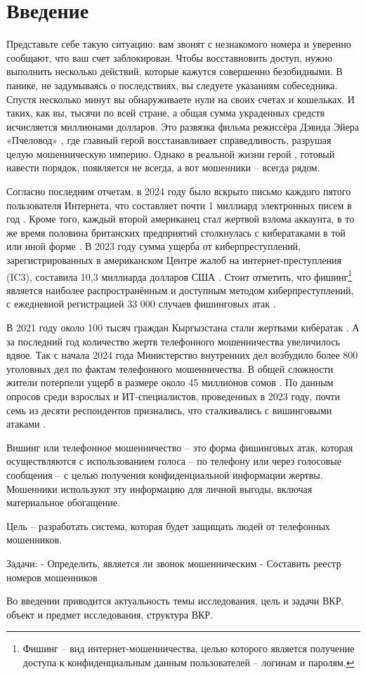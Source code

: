 \section*{\centering Введение}

Представьте себе такую ситуацию: вам звонят с незнакомого номера и уверенно сообщают, что ваш счет заблокирован. Чтобы восставновить доступ, нужно выполнить несколько действий, которые кажутся совершенно безобидными. В панике, не задумываясь о последствиях, вы следуете указаниям собеседника. Спустя несколько минут вы обнаруживаете нули на своих счетах и кошельках. И таких, как вы, тысячи по всей стране, а общая сумма украденных средств исчисляется миллионами долларов. Это развязка фильма режиссёра Дэвида Эйера «Пчеловод» \cite{beekeeper2024}, где главный герой восстанавливает справедливость, разрушая целую мошенническую империю. Однако в реальной жизни герой \cite{fraud2024}, готовый навести порядок, появляется не всегда, а вот мошенники – всегда рядом.

Согласно последним отчетам, в 2024 году было вскрыто письмо каждого пятого пользователя Интернета, что составляет почти 1 миллиард электронных писем в год \cite{griffiths2024phishing}. Кроме того, каждый второй американец стал жертвой взлома аккаунта, в то же время половина британских предприятий столкнулась с кибератаками в той или иной форме \cite{griffiths2024cybercrime}. В 2023 году сумма ущерба от киберпреступлений, зарегистрированных в американском Центре жалоб на интернет-преступления (IC3), составила 10,3 миллиарда долларов США \cite{petrosyan2023}. Стоит отметить, что фишинг\footnote{Фишинг –  вид интернет-мошенничества, целью которого является получение доступа к конфиденциальным данным пользователей – логинам и паролям.} является наиболее распространённым и доступным методом киберпреступлений, с ежедневной регистрацией 33 000 случаев фишинговых атак \cite{lewis2018}. 

В 2021 году около 100 тысяч граждан Кыргызстана стали жертвами кибератак \cite{kopytin2023}. А за последний год количество жертв телефонного мошенничества увеличилось вдвое. Так с начала 2024 года Министерство внутренних дел возбудило более 800 уголовных дел по фактам телефонного мошенничества. В общей сложности жители потерпели ущерб в размере около 45 миллионов сомов \cite{amatbekova2024}. По данным опросов среди взрослых и ИТ-специалистов, проведенных в 2023 году, почти семь из десяти респондентов признались, что сталкивались с вишинговыми атаками \cite{petrosyan2024}.

Вишинг или телефонное мошенничество – это форма фишинговых атак, которая осуществляются с использованием голоса – по телефону или через голосовые сообщения – с целью получения конфиденциальной информации жертвы. Мошенники используют эту информацию для личной выгоды, включая материальное обогащение.

Цель – разработать система, которая будет защищать людей от телефонных мошенников.

Задачи:
- Определить, является ли звонок мошенническим
- Составить реестр номеров мошенников


Во введении приводится актуальность темы исследования, цель и задачи ВКР, объект и предмет исследования, структура ВКР.

\newpage